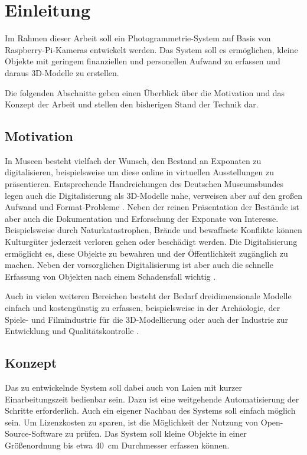 \documentclass[./00PhotoBox]{subfiles}
\begin{document}
\chapter{Einleitung}
\label{c:einleitung}

Im Rahmen dieser Arbeit soll ein Photogrammetrie-System auf Basis von Raspberry-Pi-Kameras entwickelt werden. Das System soll es ermöglichen, kleine Objekte mit geringem finanziellen und personellen Aufwand zu erfassen und daraus 3D-Modelle zu erstellen.

Die folgenden Abschnitte geben einen Überblick über die Motivation und das Konzept der Arbeit und stellen den bisherigen Stand der Technik dar.

\section{Motivation}

In Museen besteht vielfach der Wunsch, den Bestand an Exponaten zu digitalisieren, beispielsweise um diese online in virtuellen Ausstellungen zu präsentieren. Entsprechende Handreichungen des Deutschen Museumsbundes legen auch die Digitalisierung als 3D-Modelle nahe, verweisen aber auf den großen Aufwand und Format-Probleme \citep[vgl.][S. 43]{handreichung_digital}. Neben der reinen Präsentation der Bestände ist aber auch die Dokumentation und Erforschung der Exponate von Interesse. Beispielsweise durch Naturkatastrophen, Brände und bewaffnete Konflikte können Kulturgüter jederzeit verloren gehen oder beschädigt werden. Die Digitalisierung ermöglicht es, diese Objekte zu bewahren und der Öffentlichkeit zugänglich zu machen. Neben der vorsorglichen Digitalisierung ist aber auch die schnelle Erfassung von Objekten nach einem Schadensfall wichtig \citep[vgl.][]{kulturgutretter}.

Auch in vielen weiteren Bereichen besteht der Bedarf dreidimensionale Modelle einfach und kostengünstig zu erfassen, beispielsweise in der Archäologie, der Spiele- und Filmindustrie für die 3D-Modellierung oder auch der Industrie zur Entwicklung und Qualitätskontrolle \citep[vgl.][S. 37f]{luhmann}.

\section{Konzept}
Das zu entwickelnde System soll dabei auch von Laien mit kurzer Einarbeitungszeit bedienbar sein. Dazu ist eine weitgehende Automatisierung der Schritte erforderlich. Auch ein eigener Nachbau des Systems soll einfach möglich sein. Um Lizenzkosten zu sparen, ist die Möglich\-keit der Nutzung von Open-Source-Software zu prüfen. Das System soll kleine Objekte in einer Größenordnung bis etwa \SI{40}{\centi\metre} Durchmesser erfassen können.
\end{document}
